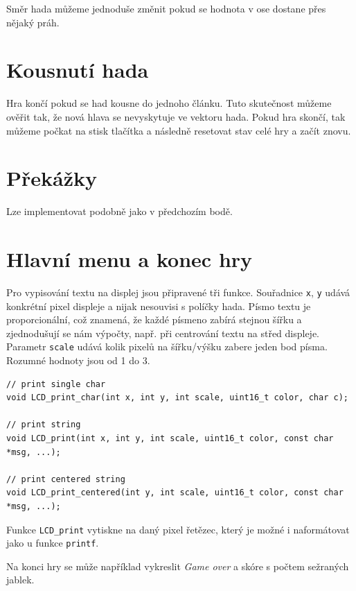 \documentclass[12pt]{article}
\begin{document}
Směr hada můžeme jednoduše změnit pokud se hodnota v ose dostane přes nějaký práh.

\section{Kousnutí hada}
Hra končí pokud se had kousne do jednoho článku.
Tuto skutečnost můžeme ověřit tak, že nová hlava se nevyskytuje ve vektoru hada.
Pokud hra skončí, tak můžeme počkat na stisk tlačítka a následně resetovat stav celé hry a začít znovu.

\section{Překážky}
Lze implementovat podobně jako v předchozím bodě.

\section{Hlavní menu a konec hry}
Pro vypisování textu na displej jsou připravené tři funkce.
Souřadnice \texttt{x}, \texttt{y} udává konkrétní pixel displeje a nijak nesouvisi s políčky hada.
Písmo textu je proporcionální, což znamená, že každé písmeno zabírá stejnou šířku a zjednodušují se nám výpočty, např. při centrování textu na střed displeje.
Parametr \texttt{scale} udává kolik pixelů na šířku/výšku zabere jeden bod písma.
Rozumné hodnoty jsou od 1 do 3.


\begin{verbatim}
// print single char
void LCD_print_char(int x, int y, int scale, uint16_t color, char c);

// print string
void LCD_print(int x, int y, int scale, uint16_t color, const char *msg, ...);

// print centered string
void LCD_print_centered(int y, int scale, uint16_t color, const char *msg, ...);
\end{verbatim}

Funkce \texttt{LCD\_print} vytiskne na daný pixel řetězec, který je možné i naformátovat jako u funkce \texttt{printf}.

Na konci hry se může například vykreslit \textit{Game over} a skóre s počtem sežraných jablek.
\end{document}
